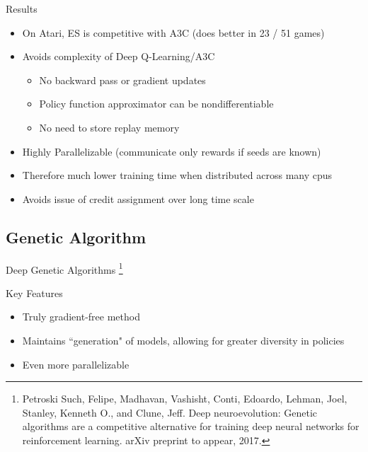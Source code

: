 \documentclass{beamer}
\begin{document}
	\begin{frame}{Results}
		\begin{itemize}
			\item On Atari, ES is competitive with A3C (does better in 23 / 51 games)
			\item Avoids complexity of Deep Q-Learning/A3C
			\begin{itemize}
				\item No backward pass or gradient updates
				\item Policy function approximator can be nondifferentiable
				\item No need to store replay memory
			\end{itemize}
			\item Highly Parallelizable (communicate only rewards if seeds are known)
			\item Therefore much lower training time when distributed across many cpus
			\item Avoids issue of credit assignment over long time scale
		\end{itemize}
	\end{frame}
	
	\subsection*{Genetic Algorithm}

	\begin{frame}
		\Huge Deep Genetic Algorithms
		\footnote{Petroski Such, Felipe, Madhavan, Vashisht, Conti,
Edoardo, Lehman, Joel, Stanley, Kenneth O., and Clune,
Jeff. Deep neuroevolution: Genetic algorithms are a
competitive alternative for training deep neural networks
for reinforcement learning. arXiv preprint to appear,
2017.}
	\end{frame}
	
	\begin{frame}{Key Features}
		\begin{itemize}
			\item Truly gradient-free method
			\item Maintains ``generation" of models, allowing for greater diversity in policies
			\item Even more parallelizable
		\end{itemize}
	\end{frame}
	
\end{document}
